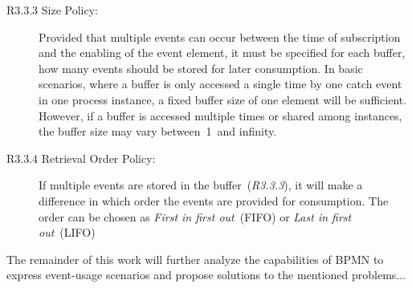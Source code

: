 \begin{description}
	\item[R3.3.3 Size Policy:]
	Provided that multiple events can occur between the time of subscription and the enabling of the event element, it must be specified for each buffer, how many events should be stored for later consumption.
	In basic scenarios, where a buffer is only accessed a single time by one catch event in one process instance, a fixed buffer size of one element will be sufficient. However, if a buffer is accessed multiple times or shared among instances, the buffer size may vary between~1~and infinity.
	
	\item[R3.3.4 Retrieval Order Policy:]
	If multiple events are stored in the buffer~(\textit{R3.3.3}), it will make a difference in which order the events are provided for consumption. The order can be chosen as \textit{First in first out}~(FIFO) or \textit{Last in first out}~(LIFO) 
	
\end{description}


\medskip \noindent
{}
The remainder of this work will further analyze the capabilities of BPMN to express event-usage scenarios and propose solutions to the mentioned problems...
